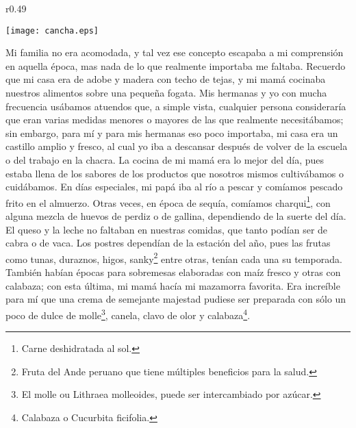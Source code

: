 \ifdefined\EnableIncludeImages
\begin{wrapfigure}{r}{0.49\textwidth}
  \begin{center}
  \vspace{-20pt}
    \texttt{[image: cancha.eps]}
  \end{center}
  \vspace{-20pt}
\end{wrapfigure}
\fi
Mi familia no era acomodada, y tal vez ese concepto escapaba a mi comprensión en aquella época, mas nada de lo que realmente importaba me faltaba.   
Recuerdo que mi casa era de adobe y madera con techo de tejas, y mi mamá cocinaba nuestros alimentos sobre una pequeña fogata. Mis hermanas y yo con mucha frecuencia usábamos atuendos que, a simple vista, cualquier persona consideraría que eran varias medidas menores o mayores de las que realmente necesitábamos;
sin embargo, para mí y para mis hermanas eso poco importaba, mi casa era un castillo amplio y fresco, al cual yo iba a descansar después de volver de la escuela o del trabajo en la chacra.
La cocina de mi mamá era lo mejor del día, pues estaba llena de los sabores de los productos que nosotros mismos cultivábamos o cuidábamos. 
En días especiales, mi papá iba al río a pescar y comíamos pescado frito en el almuerzo. Otras veces, en época de sequía, comíamos charqui\footnote{Carne deshidratada al sol.}, con alguna mezcla de huevos de perdiz o de gallina, dependiendo de la suerte del día.
El queso y la leche no faltaban en nuestras comidas, que tanto podían ser de cabra o de vaca.
Los postres dependían de la estación del año, pues las frutas como tunas, duraznos, higos, sanky\footnote{Fruta del Ande peruano que tiene múltiples beneficios para la salud.} entre otras, tenían cada una su temporada. También habían épocas para sobremesas elaboradas con maíz fresco y otras con calabaza; con esta última, mi mamá hacía mi mazamorra favorita. Era increíble para mí que una crema de semejante majestad pudiese ser preparada con sólo un poco de dulce de molle\footnote{El molle ou Lithraea molleoides, puede ser intercambiado por azúcar.}, canela, clavo de olor y calabaza\footnote{Calabaza o Cucurbita ficifolia.}.

